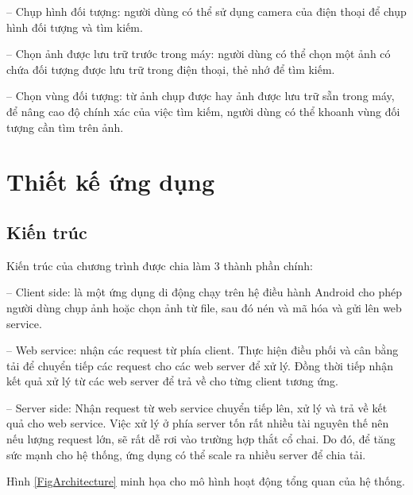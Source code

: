 -- Chụp hình đối tượng: người dùng có thể sử dụng camera của điện thoại để chụp hình đối tượng và tìm kiếm.

-- Chọn ảnh được lưu trữ trước trong máy: người dùng có thể chọn một ảnh có chứa đối tượng được lưu trữ trong điện thoại, thẻ nhớ để tìm kiếm.

-- Chọn vùng đối tượng: từ ảnh chụp được hay ảnh được lưu trữ sẵn trong máy, để nâng cao độ chính xác của việc tìm kiếm, người dùng có thể khoanh vùng đối tượng cần tìm trên ảnh.

\section{Thiết kế ứng dụng}
\label{c5-thietke}

	\subsection{Kiến trúc}
Kiến trúc của chương trình được chia làm 3 thành phần chính:

-- Client side: là một ứng dụng di động chạy trên hệ điều hành Android cho phép người dùng chụp ảnh hoặc chọn ảnh từ file, sau đó nén và mã hóa và gửi lên web service.

-- Web service: nhận các request từ phía client. Thực hiện điều phối và cân bằng tải để chuyển tiếp các request cho các web server để xử lý. Đồng thời tiếp nhận kết quả xử lý từ các web server để trả về cho từng client tương ứng.

-- Server side: Nhận request từ web service chuyển tiếp lên, xử lý và trả về kết quả cho web service. Việc xử lý ở phía server tốn rất nhiều tài nguyên thế nên nếu lượng request lớn, sẽ rất dễ rơi vào trường hợp thắt cổ chai. Do đó, để tăng sức mạnh cho hệ thống, ứng dụng có thể scale ra nhiều server để chia tải.

Hình \ref{FigArchitecture} minh họa cho mô hình hoạt động tổng quan của hệ thống.

